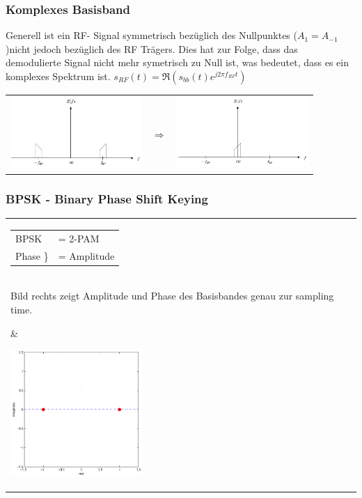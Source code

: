 \subsubsection{Komplexes Basisband }
Generell ist ein RF- Signal symmetrisch bezüglich des Nullpunktes
($A_1=A_{-1}$)nicht jedoch bezüglich des RF Trägers. Dies hat zur Folge, dass
das demodulierte Signal nicht mehr symetrisch zu Null ist, was bedeutet, dass
es ein komplexes Spektrum ist. $s_{RF}(t)=\Re(s_{bb}(t)e^{j2\pi f_{RF}t})$\\
\begin{tabular}{lll}
	\parbox{5cm}{
		\includegraphics[width=5cm]{./bilder/modulation_RFSpektrum.png}
	}
	&$\Longrightarrow$
	&\parbox{5cm}{
		\includegraphics[width=5cm]{./bilder/modulation_BBSpektrum.png}
	}
\end{tabular}

\subsubsection{BPSK - Binary Phase Shift Keying  }
\begin{tabular}{ll}
	\parbox{10cm}{
		\begin{tabular}{ll}
			BPSK&= 2-PAM \\
			Phase $\in \{-180^o, 0$\} &= Amplitude $\in \{-1, 1\}$
		\end{tabular}\\
		Bild rechts zeigt Amplitude und Phase des Basisbandes genau zur sampling
		time.\\
	}
	&
	\parbox{5cm}{
		\includegraphics[width=5cm]{./bilder/modulation_constellationBPSK.png}
	}
\end{tabular}
